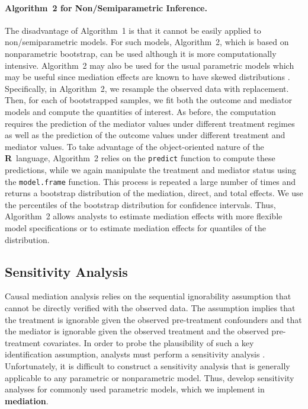 \documentclass[11pt,letterpaper]{article}
\theoremstyle{plain}
\newcommand\bR{{\bf R}}
\newcommand\bmediation{{\bf mediation}}
\begin{document}
\paragraph{Algorithm~2 for Non/Semiparametric Inference.}

The disadvantage of Algorithm~1 is that it cannot be easily applied to
non/semiparametric models.  For such models, Algorithm~2, which is
based on nonparametric bootstrap, can be used although it is more
computationally intensive.  Algorithm~2 may also be used for the usual
parametric models which may be useful since mediation effects are
known to have skewed distributions
\citep[e.g.,][]{MacKinnon:2004,Preacher:Hayes:08}.  Specifically, in
Algorithm~2, we resample the observed data with replacement.  Then,
for each of bootstrapped samples, we fit both the outcome and mediator
models and compute the quantities of interest.  As before, the
computation requires the prediction of the mediator values under
different treatment regimes as well as the prediction of the outcome
values under different treatment and mediator values.  To take
advantage of the object-oriented nature of the \bR\ language,
Algorithm~2 relies on the \texttt{predict} function to compute these
predictions, while we again manipulate the treatment and mediator
status using the \texttt{model.frame} function. This process is
repeated a large number of times and returns a bootstrap distribution
of the mediation, direct, and total effects.  We use the percentiles
of the bootstrap distribution for confidence intervals. Thus,
Algorithm~2 allows analysts to estimate mediation effects with more
flexible model specifications or to estimate mediation effects for
quantiles of the distribution.

\subsection{Sensitivity Analysis}

Causal mediation analysis relies on the sequential ignorability
assumption that cannot be directly verified with the observed data.
The assumption implies that the treatment is ignorable given the
observed pre-treatment confounders and that the mediator is ignorable
given the observed treatment and the observed pre-treatment
covariates.  In order to probe the plausibility of such a key
identification assumption, analysts must perform a sensitivity
analysis \citep{rose:02c}.  Unfortunately, it is difficult to
construct a sensitivity analysis that is generally applicable to any
parametric or nonparametric model.  Thus,
\citet{imai:keel:yama:10,imai:keel:ting:10} develop sensitivity
analyses for commonly used parametric models, which we implement in
\bmediation.
\end{document}

